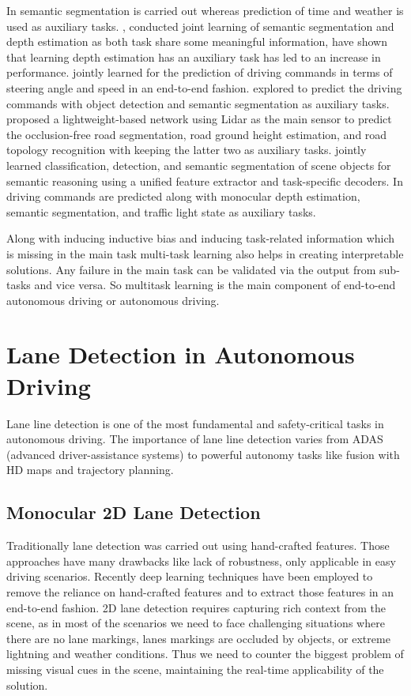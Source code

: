     In \cite{DBLP:journals/corr/abs-1805-06334} semantic segmentation is carried out whereas prediction of time and weather is used as auxiliary tasks. \cite{teichmann2018multinet}, \cite{7785137} conducted joint learning of semantic segmentation and depth estimation as both task share some meaningful information, have shown that learning depth estimation has an auxiliary task has led to an increase in performance. \cite{yang2018endtoend} jointly learned for the prediction of driving commands in terms of steering angle and speed in an end-to-end fashion. \cite{Wang2019EndtoEndSU} explored to predict the driving commands with object detection and semantic segmentation as auxiliary tasks. \cite{9090850} proposed a lightweight-based network using Lidar as the main sensor to predict the occlusion-free road segmentation, road ground height estimation, and road topology recognition with keeping the latter two as auxiliary tasks. \cite{teichmann2018multinet} jointly learned classification, detection, and semantic segmentation of scene objects for semantic reasoning using a unified feature extractor and task-specific decoders. In \cite{9523129} driving commands are predicted along with monocular depth estimation, semantic segmentation, and traffic light state as auxiliary tasks. 
    
    Along with inducing inductive bias and inducing task-related information which is missing in the main task multi-task learning also helps in creating interpretable solutions. Any failure in the main task can be validated via the output from sub-tasks and vice versa. So multitask learning is the main component of end-to-end autonomous driving or autonomous driving.  

    \section{Lane Detection in Autonomous Driving}
     Lane line detection is one of the most fundamental and safety-critical tasks in autonomous driving. The importance of lane line detection varies from ADAS (advanced driver-assistance systems) to powerful autonomy tasks like fusion with HD maps and trajectory planning.
        \subsection{Monocular 2D Lane Detection}
        Traditionally lane detection was carried out using hand-crafted features. Those approaches have many drawbacks like lack of robustness, only applicable in easy driving scenarios. Recently deep learning techniques have been employed to remove the reliance on hand-crafted features and to extract those features in an end-to-end fashion. 2D lane detection requires capturing rich context from the scene, as in most of the scenarios we need to face challenging situations where there are no lane markings, lanes markings are occluded by objects, or extreme lightning and weather conditions. Thus we need to counter the biggest problem of missing visual cues in the scene, maintaining the real-time applicability of the solution.
        
